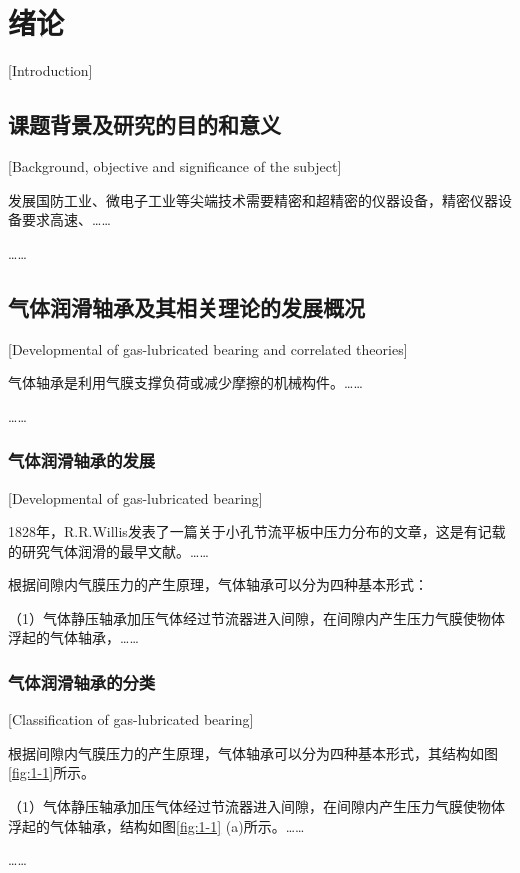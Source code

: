 
\chapter{绪论}[Introduction]

\section{课题背景及研究的目的和意义}[Background, objective and significance of the subject]

发展国防工业、微电子工业等尖端技术需要精密和超精密的仪器设备，精密仪器设备要求高速、……

……

\section{气体润滑轴承及其相关理论的发展概况}[Developmental of gas-lubricated bearing and correlated theories]

气体轴承是利用气膜支撑负荷或减少摩擦的机械构件。……

……

\subsection{气体润滑轴承的发展}[Developmental of gas-lubricated bearing]

1828年，R.R.Willis\cite{zhao1998}发表了一篇关于小孔节流平板中压力分布的文章，这是有记载的研究气体润滑的最早文献。……

根据间隙内气膜压力的产生原理，气体轴承可以分为四种基本形式：

（1）气体静压轴承\quad 加压气体经过节流器进入间隙，在间隙内产生压力气膜使物体浮起的气体轴承，……

\subsection{气体润滑轴承的分类}[Classification of gas-lubricated bearing]

根据间隙内气膜压力的产生原理，气体轴承可以分为四种基本形式，其结构如图\ref{fig:1-1}所示。

（1）气体静压轴承\quad 加压气体经过节流器进入间隙，在间隙内产生压力气膜使物体浮起的气体轴承，结构如图\ref{fig:1-1} (a)所示。……

……

